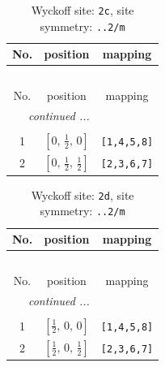 \documentclass[fleqn,8pt]{jsarticle}
\begin{document}
\renewcommand{\arraystretch}{1.2}
\begin{longtable}{ccc}
\caption{Wyckoff site: {\tt 2c}, site symmetry: {\tt ..2/m}}
 \\
 \hline \hline
No. & position & mapping \\ \hline \endfirsthead

\multicolumn{2}{l}{\tablename\ \thetable{}} \\
 \hline \hline
No. & position & mapping \\ \hline \endhead

 \hline \hline
\multicolumn{2}{r}{\footnotesize\it continued ...} \\ \endfoot

 \hline \hline
\multicolumn{2}{r}{} \\ \endlastfoot

1 & $\left[ 0,\, \frac{1}{2},\, 0 \right]$ & {\tt [1,4,5,8]} \\ \hline
2 & $\left[ 0,\, \frac{1}{2},\, \frac{1}{2} \right]$ & {\tt [2,3,6,7]} \\
\end{longtable}
\renewcommand{\arraystretch}{1.2}
\begin{longtable}{ccc}
\caption{Wyckoff site: {\tt 2d}, site symmetry: {\tt ..2/m}}
 \\
 \hline \hline
No. & position & mapping \\ \hline \endfirsthead

\multicolumn{2}{l}{\tablename\ \thetable{}} \\
 \hline \hline
No. & position & mapping \\ \hline \endhead

 \hline \hline
\multicolumn{2}{r}{\footnotesize\it continued ...} \\ \endfoot

 \hline \hline
\multicolumn{2}{r}{} \\ \endlastfoot

1 & $\left[ \frac{1}{2},\, 0,\, 0 \right]$ & {\tt [1,4,5,8]} \\ \hline
2 & $\left[ \frac{1}{2},\, 0,\, \frac{1}{2} \right]$ & {\tt [2,3,6,7]} \\
\end{longtable}
\renewcommand{\arraystretch}{1.2}
\end{document}
